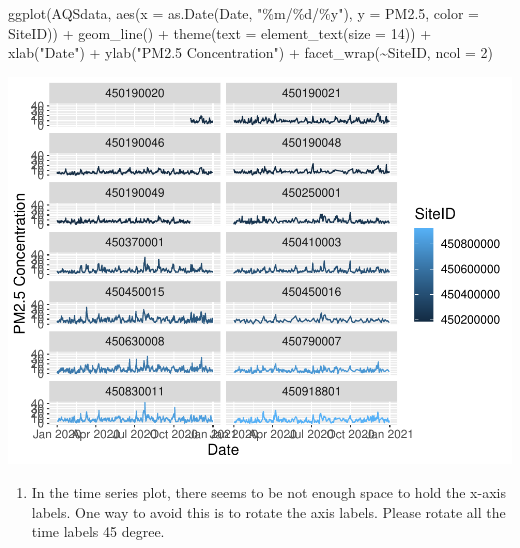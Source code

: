 \documentclass[
]{article}
\newenvironment{Shaded}{\begin{snugshade}}{\end{snugshade}}
\newcommand{\AttributeTok}[1]{\textcolor[rgb]{0.77,0.63,0.00}{#1}}
\newcommand{\DecValTok}[1]{\textcolor[rgb]{0.00,0.00,0.81}{#1}}
\newcommand{\FloatTok}[1]{\textcolor[rgb]{0.00,0.00,0.81}{#1}}
\newcommand{\FunctionTok}[1]{\textcolor[rgb]{0.00,0.00,0.00}{#1}}
\newcommand{\NormalTok}[1]{#1}
\newcommand{\SpecialCharTok}[1]{\textcolor[rgb]{0.00,0.00,0.00}{#1}}
\newcommand{\StringTok}[1]{\textcolor[rgb]{0.31,0.60,0.02}{#1}}
\providecommand{\tightlist}{%
  \setlength{\itemsep}{0pt}\setlength{\parskip}{0pt}}
\begin{document}
\begin{Shaded}
\begin{Highlighting}[]
\FunctionTok{ggplot}\NormalTok{(AQSdata, }\FunctionTok{aes}\NormalTok{(}\AttributeTok{x =} \FunctionTok{as.Date}\NormalTok{(Date, }\StringTok{"\%m/\%d/\%y"}\NormalTok{), }\AttributeTok{y =}\NormalTok{ PM2}\FloatTok{.5}\NormalTok{,}
    \AttributeTok{color =}\NormalTok{ SiteID)) }\SpecialCharTok{+} \FunctionTok{geom\_line}\NormalTok{() }\SpecialCharTok{+} \FunctionTok{theme}\NormalTok{(}\AttributeTok{text =} \FunctionTok{element\_text}\NormalTok{(}\AttributeTok{size =} \DecValTok{14}\NormalTok{)) }\SpecialCharTok{+}
    \FunctionTok{xlab}\NormalTok{(}\StringTok{"Date"}\NormalTok{) }\SpecialCharTok{+} \FunctionTok{ylab}\NormalTok{(}\StringTok{"PM2.5 Concentration"}\NormalTok{) }\SpecialCharTok{+} \FunctionTok{facet\_wrap}\NormalTok{(}\SpecialCharTok{\textasciitilde{}}\NormalTok{SiteID,}
    \AttributeTok{ncol =} \DecValTok{2}\NormalTok{)}
\end{Highlighting}
\end{Shaded}

\includegraphics{HW1-Trinath-Sai-Subhash-Reddy-Pittala_files/figure-latex/unnamed-chunk-26-1.pdf}

\begin{enumerate}
\def\labelenumi{\alph{enumi}.}
\setcounter{enumi}{9}
\tightlist
\item
  In the time series plot, there seems to be not enough space to hold
  the x-axis labels. One way to avoid this is to rotate the axis labels.
  Please rotate all the time labels 45 degree.
\end{enumerate}
\end{document}
